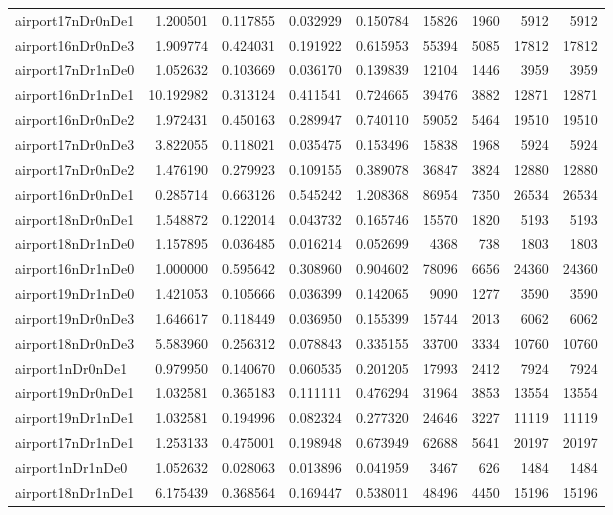 \begin{longtable}{|l|r|r|r|r|r|r|r|r|}
airport17nDr0nDe1 & 1.200501 & 0.117855 & 0.032929 & 0.150784 & 15826 & 1960 & 5912 & 5912 \\
airport16nDr0nDe3 & 1.909774 & 0.424031 & 0.191922 & 0.615953 & 55394 & 5085 & 17812 & 17812 \\
airport17nDr1nDe0 & 1.052632 & 0.103669 & 0.036170 & 0.139839 & 12104 & 1446 & 3959 & 3959 \\
airport16nDr1nDe1 & 10.192982 & 0.313124 & 0.411541 & 0.724665 & 39476 & 3882 & 12871 & 12871 \\
airport16nDr0nDe2 & 1.972431 & 0.450163 & 0.289947 & 0.740110 & 59052 & 5464 & 19510 & 19510 \\
airport17nDr0nDe3 & 3.822055 & 0.118021 & 0.035475 & 0.153496 & 15838 & 1968 & 5924 & 5924 \\
airport17nDr0nDe2 & 1.476190 & 0.279923 & 0.109155 & 0.389078 & 36847 & 3824 & 12880 & 12880 \\
airport16nDr0nDe1 & 0.285714 & 0.663126 & 0.545242 & 1.208368 & 86954 & 7350 & 26534 & 26534 \\
airport18nDr0nDe1 & 1.548872 & 0.122014 & 0.043732 & 0.165746 & 15570 & 1820 & 5193 & 5193 \\
airport18nDr1nDe0 & 1.157895 & 0.036485 & 0.016214 & 0.052699 & 4368 & 738 & 1803 & 1803 \\
airport16nDr1nDe0 & 1.000000 & 0.595642 & 0.308960 & 0.904602 & 78096 & 6656 & 24360 & 24360 \\
airport19nDr1nDe0 & 1.421053 & 0.105666 & 0.036399 & 0.142065 & 9090 & 1277 & 3590 & 3590 \\
airport19nDr0nDe3 & 1.646617 & 0.118449 & 0.036950 & 0.155399 & 15744 & 2013 & 6062 & 6062 \\
airport18nDr0nDe3 & 5.583960 & 0.256312 & 0.078843 & 0.335155 & 33700 & 3334 & 10760 & 10760 \\
airport1nDr0nDe1 & 0.979950 & 0.140670 & 0.060535 & 0.201205 & 17993 & 2412 & 7924 & 7924 \\
airport19nDr0nDe1 & 1.032581 & 0.365183 & 0.111111 & 0.476294 & 31964 & 3853 & 13554 & 13554 \\
airport19nDr1nDe1 & 1.032581 & 0.194996 & 0.082324 & 0.277320 & 24646 & 3227 & 11119 & 11119 \\
airport17nDr1nDe1 & 1.253133 & 0.475001 & 0.198948 & 0.673949 & 62688 & 5641 & 20197 & 20197 \\
airport1nDr1nDe0 & 1.052632 & 0.028063 & 0.013896 & 0.041959 & 3467 & 626 & 1484 & 1484 \\
airport18nDr1nDe1 & 6.175439 & 0.368564 & 0.169447 & 0.538011 & 48496 & 4450 & 15196 & 15196 \\

\end{longtable}

